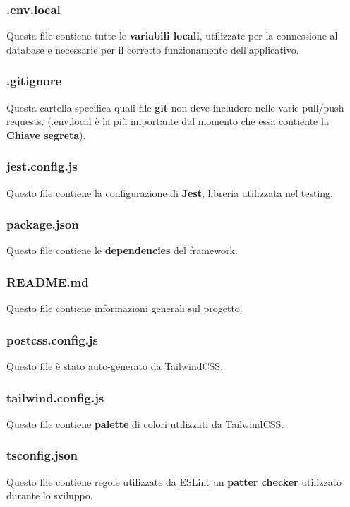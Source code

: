\documentclass[11pt, a4paper]{article}
\theoremstyle{definition}
\begin{document}
\subsubsection{.env.local}
Questa file contiene tutte le \textbf{variabili locali}, utilizzate per la connessione al database e necessarie per il corretto funzionamento dell'applicativo.
\subsubsection{.gitignore}
Questa cartella specifica quali file \textbf{git} non deve includere nelle varie pull/push requests. (.env.local è la più importante dal momento che essa contiente la \textbf{Chiave segreta}).
\subsubsection{jest.config.js}
Questo file contiene la configurazione di \textbf{Jest}, libreria utilizzata nel testing.
\subsubsection{package.json}
Questo file contiene le \textbf{dependencies} del framework.
\subsubsection{README.md}
Questo file contiene informazioni generali sul progetto.
\subsubsection{postcss.config.js}
Questo file è stato auto-generato da \href{https://tailwindcss.com/}{TailwindCSS}.
\subsubsection{tailwind.config.js}
Questo file contiene \textbf{palette} di colori utilizzati da \href{https://tailwindcss.com/}{TailwindCSS}.
\subsubsection{tsconfig.json}
Questo file contiene regole utilizzate da \href{https://eslint.org/}{ESLint} un \textbf{patter checker} utilizzato durante lo sviluppo.
  
\end{document}
